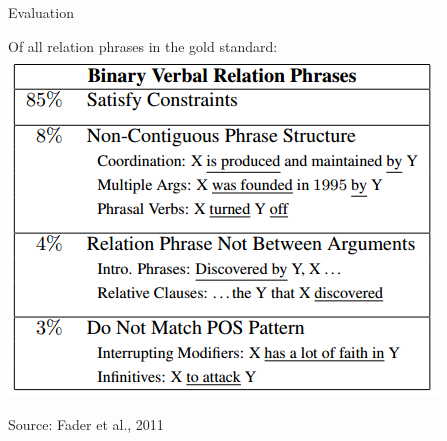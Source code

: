 \documentclass[11pt]{beamer}
\begin{document}
		\begin{frame}{Evaluation}
					\begin{center}
						Of all relation phrases in the gold standard:
						\includegraphics[scale=0.8]{img/constraints.png}\\
						
						\begin{scriptsize}Source: Fader et al., 2011\end{scriptsize}
					\end{center}
				\end{frame}
	
\end{document}
